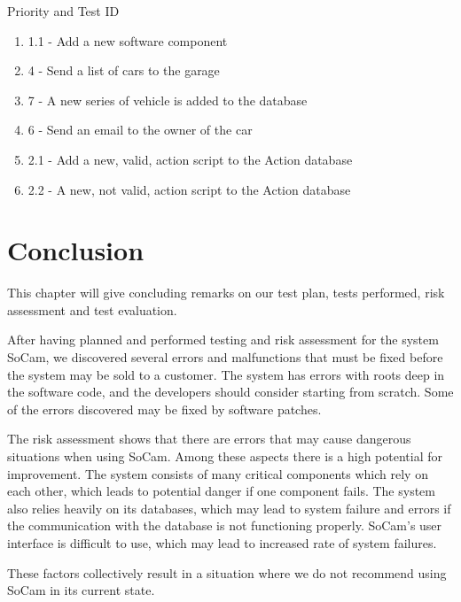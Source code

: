 		Priority and Test ID
		\begin{enumerate}
			\item 1.1 - Add a new software component
			\item 4 - Send a list of cars to the garage
			\item 7 - A new series of vehicle is added to the database
			\item 6 - Send an email to the owner of the car
			\item 2.1 - Add a new, valid, action script to the Action database
			\item 2.2 - A new, not valid, action script to the Action database

		\end{enumerate}	


	\section{Conclusion}

		This chapter will give concluding remarks on our test plan, tests performed, risk assessment and test evaluation. 

		After having planned and performed testing and risk assessment for the system SoCam, we discovered several errors and malfunctions that must be fixed before the system may be sold to a customer. The system has errors with roots deep in the software code, and the developers should consider starting from scratch. Some of the errors discovered may be fixed by software patches. 

		The risk assessment shows that there are errors that may cause dangerous situations when using SoCam. Among these aspects there is a high potential for improvement. The system consists of many critical components which rely on each other, which leads to potential danger if one component fails. The system also relies heavily on its databases, which may lead to system failure and errors if the communication with the database is not functioning properly. SoCam’s user interface is difficult to use, which may lead to increased rate of system failures. 

		These factors collectively result in a situation where we do not recommend using SoCam in its current state.


